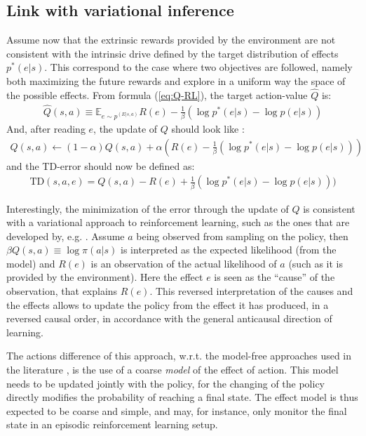 \documentclass[runningheads]{llncs}
\begin{document}
\subsection*{Link with variational inference}
Assume now that the extrinsic rewards provided by the environment are not consistent with the intrinsic drive defined by the target distribution of effects $p^*(e|s)$. This correspond to the case where two objectives are followed, namely both maximizing the future rewards and explore in a uniform way the space of the possible effects. From formula (\ref{eq:Q-RL}), the target action-value $\hat{Q}$ is:
\begin{align}
\hat{Q}(s,a) \equiv \mathbb{E}_{e\sim p^(E|s,a)} R(e) - \frac{1}{\beta} (\log p^*(e|s) - \log p(e|s))
\end{align}
And, after reading $e$, the update of $Q$ should look like :
\begin{align}
Q(s,a) \leftarrow (1-\alpha) Q(s,a) + \alpha  (R(e) - \frac{1}{\beta} (\log p^*(e|s) - \log p(e|s)))
\end{align}
and the TD-error should now be defined as:
\begin{align}\label{eq:var-RL}
\text{TD}(s,a,e) = Q(s,a) - R(e) + \frac{1}{\beta} (\log p^*(e|s) - \log p(e|s)))
\end{align}

Interestingly, the minimization of the error through the update of $Q$ is consistent with a variational approach to reinforcement learning, such as the ones that are developed by, e.g. \cite{levine2013guided}.
Assume $a$ being observed from sampling on the policy, then $\beta Q(s,a)\equiv \log \pi(a|s)$ is interpreted as the expected likelihood (from the model) and $R(e)$ is an observation of the actual likelihood of $a$ (such as it is provided by the environment). Here the effect $e$ is seen as the ``cause'' of the observation, that explains $R(e)$. This reversed interpretation of the causes and the effects allows to update the policy from the effect it has produced, in a reversed causal order, in accordance with the general anticausal direction of learning.

The actions difference of this approach, w.r.t. the model-free approaches used in the literature \cite{toussaint2009robot,levine2013guided}, is the use of a coarse \emph{model} of the effect of action. This model needs to be updated jointly with the policy, for the changing of the policy directly modifies the probability of reaching a final state. The effect model is thus expected to be coarse and simple, and may, for instance, only monitor the final state in an episodic reinforcement learning setup. 
\end{document}
